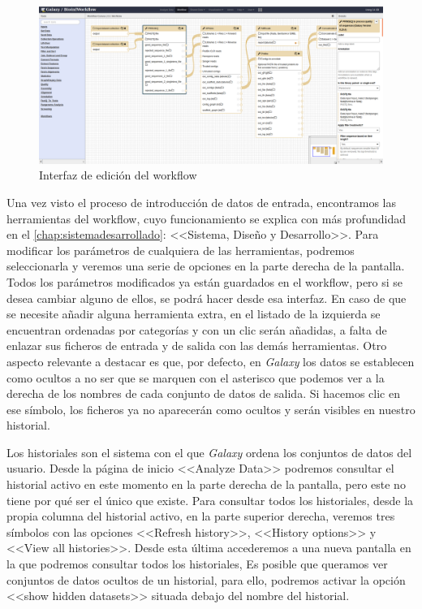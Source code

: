 \begin{figure}
    \begin{center}
      \includegraphics[scale=0.3]{images/InterfazWorkflowEdit.png}
      \caption{Interfaz de edición del workflow}
      \label{fig:WorkflowEdit}
    \end{center}
\end{figure}
Una vez visto el proceso de introducción de datos de entrada, encontramos las herramientas del workflow, cuyo funcionamiento se explica con más profundidad en el \autoref{chap:sistemadesarrollado}: <<Sistema, Diseño y Desarrollo>>. Para modificar los parámetros de cualquiera de las herramientas, podremos seleccionarla y veremos una serie de opciones en la parte derecha de la pantalla. Todos los parámetros modificados ya están guardados en el workflow, pero si se desea cambiar alguno de ellos, se podrá hacer desde esa interfaz. En caso de que se necesite añadir alguna herramienta extra, en el listado de la izquierda se encuentran ordenadas por categorías y con un clic serán añadidas, a falta de enlazar sus ficheros de entrada y de salida con las demás herramientas. Otro aspecto relevante a destacar es que, por defecto, en \textit{Galaxy} los datos se establecen como ocultos a no ser que se marquen con el asterisco que podemos ver a la derecha de los nombres de cada conjunto de datos de salida. Si hacemos clic en ese símbolo, los ficheros ya no aparecerán como ocultos y serán visibles en nuestro historial.

Los historiales son el sistema con el que \textit{Galaxy} ordena los conjuntos de datos del usuario. Desde la página de inicio <<Analyze Data>> podremos consultar el historial activo en este momento  en la parte derecha de la pantalla, pero este no tiene por qué ser el único que existe. Para consultar todos los historiales, desde la propia columna del historial activo, en la parte superior derecha, veremos tres símbolos con las opciones <<Refresh history>>, <<History options>> y <<View all histories>>. Desde esta última accederemos a una nueva pantalla en la que podremos consultar todos los historiales, Es posible que queramos ver conjuntos de datos ocultos de un historial, para ello, podremos activar la opción <<show hidden datasets>> situada debajo del nombre del historial.

